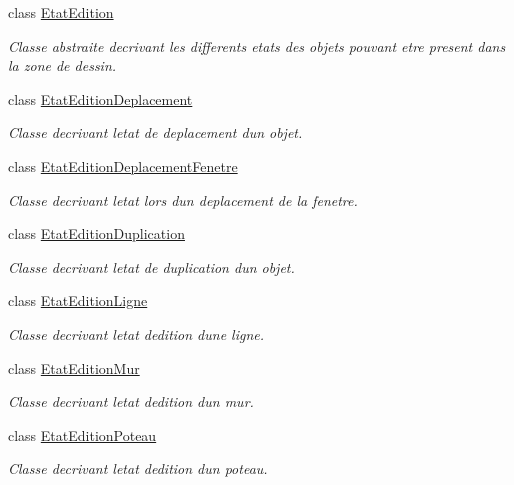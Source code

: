 \begin{DoxyCompactItemize}
class \hyperlink{class_interface_graphique_1_1_etat_edition}{Etat\+Edition}
\begin{DoxyCompactList}\small\item\em Classe abstraite decrivant les differents etats des objets pouvant etre present dans la zone de dessin. \end{DoxyCompactList}\item 
class \hyperlink{class_interface_graphique_1_1_etat_edition_deplacement}{Etat\+Edition\+Deplacement}
\begin{DoxyCompactList}\small\item\em Classe decrivant l\textquotesingle{}etat de deplacement d\textquotesingle{}un objet. \end{DoxyCompactList}\item 
class \hyperlink{class_interface_graphique_1_1_etat_edition_deplacement_fenetre}{Etat\+Edition\+Deplacement\+Fenetre}
\begin{DoxyCompactList}\small\item\em Classe decrivant l\textquotesingle{}etat lors d\textquotesingle{}un deplacement de la fenetre. \end{DoxyCompactList}\item 
class \hyperlink{class_interface_graphique_1_1_etat_edition_duplication}{Etat\+Edition\+Duplication}
\begin{DoxyCompactList}\small\item\em Classe decrivant l\textquotesingle{}etat de duplication d\textquotesingle{}un objet. \end{DoxyCompactList}\item 
class \hyperlink{class_interface_graphique_1_1_etat_edition_ligne}{Etat\+Edition\+Ligne}
\begin{DoxyCompactList}\small\item\em Classe decrivant l\textquotesingle{}etat d\textquotesingle{}edition d\textquotesingle{}une ligne. \end{DoxyCompactList}\item 
class \hyperlink{class_interface_graphique_1_1_etat_edition_mur}{Etat\+Edition\+Mur}
\begin{DoxyCompactList}\small\item\em Classe decrivant l\textquotesingle{}etat d\textquotesingle{}edition d\textquotesingle{}un mur. \end{DoxyCompactList}\item 
class \hyperlink{class_interface_graphique_1_1_etat_edition_poteau}{Etat\+Edition\+Poteau}
\begin{DoxyCompactList}\small\item\em Classe decrivant l\textquotesingle{}etat d\textquotesingle{}edition d\textquotesingle{}un poteau. \end{DoxyCompactList}\item 

\end{DoxyCompactItemize}
